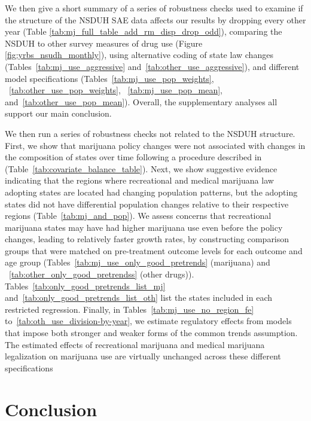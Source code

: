 \documentclass[12pt]{article}%
\begin{document}
We then give a short summary of a series of robustness checks used to examine if the structure of the NSDUH SAE data affects our results by dropping every other year (Table  \ref{tab:mj_full_table_add_rm_disp_drop_odd}), comparing the NSDUH to other survey measures of drug use (Figure \ref{fig:yrbs_nsudh_monthly}), using alternative coding of state law changes (Tables~\ref{tab:mj_use_aggressive} and~\ref{tab:other_use_aggressive}), and different model specifications (Tables~\ref{tab:mj_use_pop_weights}, ~\ref{tab:other_use_pop_weights}, ~\ref{tab:mj_use_pop_mean}, and~\ref{tab:other_use_pop_mean}).  Overall, the supplementary analyses all support our main conclusion. 

We then run a series of robustness checks not related to the NSDUH structure. 
First, we show that marijuana policy changes were not associated with changes in the composition of states over time following a procedure described in \citet{Pei2019} (Table~\ref{tab:covariate_balance_table}). 
Next, we show suggestive evidence indicating that the regions where recreational and medical marijuana law adopting states are located had changing population patterns, but the adopting states did not have differential population changes relative to their respective regions (Table~\ref{tab:mj_and_pop}). We assess concerns that recreational marijuana states may have had higher marijuana use even before the policy changes, leading to relatively faster growth rates, by constructing comparison groups that were matched on pre-treatment outcome levels for each outcome and age group (Tables~\ref{tab:mj_use_only_good_pretrends} (marijuana) and ~\ref{tab:other_only_good_pretrendss} (other drugs)).  Tables~\ref{tab:only_good_pretrends_list_mj} and~\ref{tab:only_good_pretrends_list_oth} list the states included in each restricted regression. Finally, in Tables~\ref{tab:mj_use_no_region_fe} to~\ref{tab:oth_use_division-by-year}, we estimate regulatory effects from models that impose both stronger and weaker forms of the common trends assumption. The estimated
effects of recreational marijuana and medical marijuana legalization on marijuana use are virtually unchanged across these different specifications


    
\section{Conclusion} 
\label{sec:Conclusion}
\end{document}
